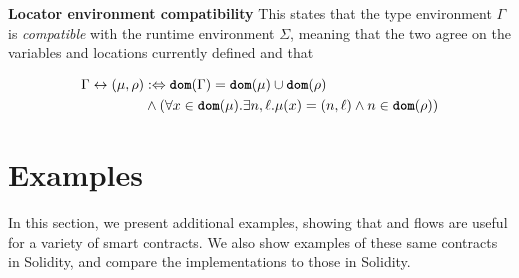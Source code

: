 \documentclass[nonacm, dvipsnames, sigconf]{acmart}
\begin{document}
\begin{mathpar}

\end{mathpar}

\framebox{$\Gamma \compat \Sigma$} \textbf{Locator environment compatibility}
This states that the type environment $\Gamma$ is \emph{compatible} with the runtime environment $\Sigma$, meaning that the two agree on the variables and locations currently defined and that

\begin{align*}
    \Gamma \compat (\mu, \rho) &:\iff \dom(\Gamma) = \dom(\mu) \cup \dom(\rho) \\
                               &\land (\forall x \in \dom(\mu). \exists n,\ell. \mu(x) = (n,\ell) \land n \in \dom(\rho))
\end{align*}


\section{Examples}

In this section, we present additional examples, showing that \langName and flows are useful for a variety of smart contracts.
We also show examples of these same contracts in Solidity, and compare the \langName implementations to those in Solidity.
\end{document}
